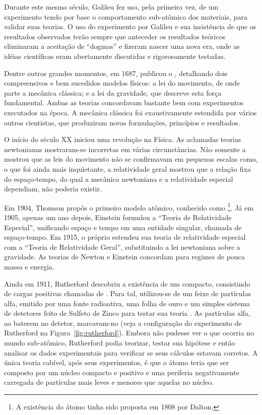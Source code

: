 Durante este mesmo século, Galileu fez uso, pela primeira vez, de um
experimento tendo por base o comportamento sub-atômico dos materiais, para
validar suas teorias. O uso do experimento por Galileu e sua insistência de
que os resultados observados terão sempre que anteceder os resultados teóricos
eliminaram a aceitação de ``dogmas'' e fizeram nascer uma nova era, onde as
idéias científicas eram abertamente discutidas e rigorosamente testadas.

Dentre outros grandes momentos, em 1687,  publicou o
, detalhando dois compreensivos e bem sucedidos
modelos físicos: a lei do movimento, de onde parte a mecânica clássica; e a
lei da gravidade, que descreve esta força fundamental. Ambas as teorias
concordavam bastante bem com experimentos executados na época. A mecânica
clássica foi exaustivamente estendida por vários outros cientistas, que
produziram novas formulações, princípios e resultados.

O início do século XX iniciou uma revolução na Física. As aclamadas teorias
newtonianas mostraram-se incorretas em várias circunstâncias. Não somente a
 mostrou que as leis do movimento não se confirmavam em
pequenas escalas como, o que foi ainda mais inquietante, a relatividade geral
mostrou que a relação fixa do espaço-tempo, do qual a mecânica newtoniana e a
relatividade especial dependiam, não poderia existir.

Em 1904, Thomson propôs o primeiro modelo atômico, conhecido como
\footnote{A existência do átomo tinha sido proposta
em 1808 por Dalton.}. Já em 1905, apenas um ano depois, Einstein formulou a
``Teoria de Relatividade Especial'', unificando espaço e tempo em uma entidade
singular, chamada de espaço-tempo. Em 1915, o próprio estendeu sua teoria de
relatividade especial com a ``Teoria de Relatividade Geral'', substituindo a
lei newtoniana sobre a gravidade. As teorias de Newton e Einstein concordam
para regimes de pouca massa e energia.

Ainda em 1911, Rutherford descobriu a existência de um 
compacto, consistindo de cargas positivas chamadas de . Para tal,
utilizou-se de um feixe de partículas alfa, emitido por uma fonte radioativa,
uma folha de ouro e um simples sistema de detetores feito de Sulfeto de Zinco
para testar sua teoria \cite{halliday}. As partículas alfa, ao baterem no
detetor, marcavam-no (veja a configuração do experimento de Rutherford na
Figura~\ref{fig:rutherford}). Embora não pudesse ver o que ocorria no mundo
sub-atômico, Rutherford podia teorizar, testar sua hipótese e então analisar
os dados experimentais para verificar se seus cálculos estavam corretos. A
única teoria cabível, após seus experimentos, é que o átomo teria que ser
composto por um núcleo compacto e positivo e uma periferia negativamente
carregada de partículas mais leves e menores que aquelas no núcleo.

